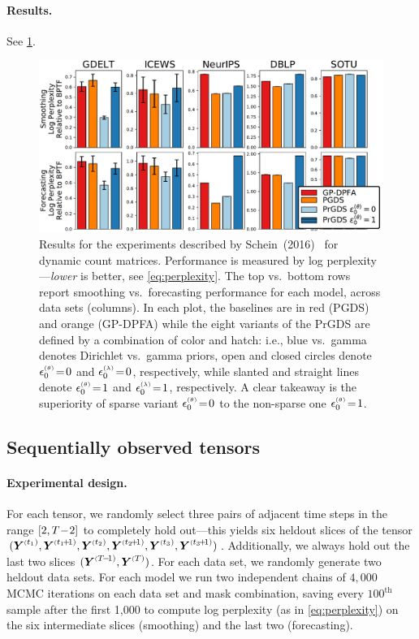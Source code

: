 \documentclass{article}
\begin{document}
\paragraph{Results.} See \cref{fig:matrix_results}.
\begin{figure}[t]
\centering
\includegraphics[width=\linewidth]{../../results/matrices/new_matrix_results.pdf}
\caption{\footnotesize \label{fig:matrix_results}Results for the experiments described by Schein~(2016)~\cite{schein2016poisson} for dynamic count matrices. Performance is measured by log perplexity---\emph{lower} is better, see \cref{eq:perplexity}. The top vs.\ bottom rows report smoothing vs.\ forecasting performance for each model, across data sets (columns). In each plot, the baselines are in red (PGDS) and orange (GP-DPFA) while the eight variants of the PrGDS are defined by a combination of color and hatch: i.e., blue vs.\ gamma denotes Dirichlet vs.\ gamma priors, open and closed circles denote $\epstheta \teq 0$ and $\epslambda \teq 0$, respectively, while slanted and straight lines denote $\epstheta \teq 1$ and $\epslambda \teq 1$, respectively. A clear takeaway is the superiority of sparse variant $\epstheta \teq 0$ to the non-sparse one $\epstheta \teq 1$.}
\end{figure}
\subsection{Sequentially observed tensors}
\paragraph{Experimental design.} For each tensor, we randomly select three pairs of adjacent time steps in the range $[2, T\!-\! 2]$ to completely hold out---this yields six heldout slices of the tensor $(\Yten^{\mathsmaller(t_1)},\Yten^{\mathsmaller(t_1 \tp 1)}, \Yten^{\mathsmaller(t_2)}, \Yten^{\mathsmaller(t_2 \tp 1)}, \Yten^{\mathsmaller(t_3)}, \Yten^{\mathsmaller(t_3 \tp 1)})$. Additionally, we always hold out the last two slices $(\Yten^{\mathsmaller(T \tm 1)}, \Yten^{\mathsmaller(T)})$. For each data set, we randomly generate two heldout data sets. For each model we run two independent chains of $4,000$ MCMC iterations on each data set and mask combination, saving every $100^{\textrm{th}}$ sample after the first 1,000 to compute log perplexity (as in \cref{eq:perplexity}) on the six intermediate slices (smoothing) and the last two (forecasting).
\end{document}
